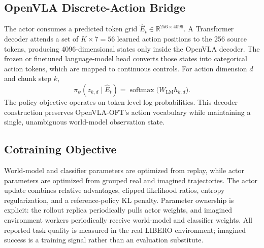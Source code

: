 \subsection{OpenVLA Discrete-Action Bridge}

The actor consumes a predicted token grid
$\widehat{E}_t\in\mathbb{R}^{256\times4096}$.  A Transformer decoder attends a
set of $K\times7=56$ learned action positions to the 256 source tokens, producing
4096-dimensional states only inside the OpenVLA decoder.  The frozen or
finetuned language-model head converts those states into categorical action
tokens, which are mapped to continuous controls.  For action dimension $d$ and
chunk step $k$,
\[
\pi_\psi(z_{k,d}\mid\widehat{E}_t)
  = \operatorname{softmax}\bigl(W_{\mathrm{LM}}h_{k,d}\bigr).
\]
The policy objective operates on token-level log probabilities.  This decoder
construction preserves OpenVLA-OFT's action vocabulary while maintaining a
single, unambiguous world-model observation state.

\subsection{Cotraining Objective}

World-model and classifier parameters are optimized from replay, while actor
parameters are optimized from grouped real and imagined trajectories.  The
actor update combines relative advantages, clipped likelihood ratios, entropy
regularization, and a reference-policy KL penalty.  Parameter ownership is
explicit: the rollout replica periodically pulls actor weights, and imagined
environment workers periodically receive world-model and classifier weights.
All reported task quality is measured in the real LIBERO environment; imagined
success is a training signal rather than an evaluation substitute.

